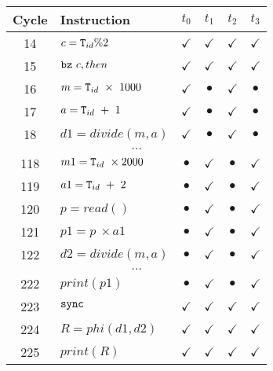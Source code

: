 \documentclass[times,10pt,twocolumn]{article}
\newcommand{\tid}{\mbox{\texttt{T}}_{id}}
\newcommand{\code}[1]{\mbox{\texttt{#1}}}
\begin{document}
\begin{figure}[b!]
\begin{center}
\begin{small}
\begin{tabular}{|c|l|c|c|c|c|} \hline
Cycle   & Instruction                  & $t_0$        & $t_1$        & $t_2$        & $t_3$        \\ \hline
14      & $ c = \tid \% 2$             & $\checkmark$ & $\checkmark$ & $\checkmark$ & $\checkmark$ \\ \hline
15      & $ \code{bz} \ c, then$ & $\checkmark$ & $\checkmark$ & $\checkmark$ & $\checkmark$ \\ \hline
16      & $ m = \tid \ \times \ 1000$        & $\checkmark$    & $\bullet$ & $\checkmark$ & $\bullet$ \\ \hline
17      & $ a = \tid \ + \ 1$ & $\checkmark$    & $\bullet$ & $\checkmark$ & $\bullet$ \\ \hline
18      & $ d1 = divide(m, a)$ & $\checkmark$    & $\bullet$ & $\checkmark$ & $\bullet$ \\ \hline
\multicolumn{6}{c}{$\ldots$} \\ \hline
118      & $ m1 = \tid \ \times 2000$ & $\bullet$    & $\checkmark$ & $\bullet$ & $\checkmark$ \\ \hline
119     & $ a1 = \tid \ + \ 2$        & $\bullet$    & $\checkmark$    & $\bullet$ & $\checkmark$ \\ \hline
120     & $ p = read()$ & $\bullet$    & $\checkmark$    & $\bullet$ & $\checkmark$ \\ \hline
121     & $ p1 = p \ \times a1$ & $\bullet$    & $\checkmark$ & $\bullet$ & $\checkmark$ \\ \hline
122     & $ d2 = divide(m, a)$        & $\bullet$    & $\checkmark$    & $\bullet$ & $\checkmark$ \\ \hline
\multicolumn{6}{c}{$\ldots$} \\ \hline
222      & $ print(p1)$ & $\bullet$    & $\checkmark$    & $\bullet$ & $\checkmark$ \\ \hline
223     & $ \code{sync}$        & $\checkmark$ & $\checkmark$ & $\checkmark$ & $\checkmark$ \\ \hline
224     & $ R = phi(d1, d2)$    & $\checkmark$ & $\checkmark$ & $\checkmark$ & $\checkmark$ \\ \hline
225     & $ print(R)$ & $\checkmark$    & $\checkmark$ & $\checkmark$ & $\checkmark$ \\ \hline
\end{tabular}


\end{small}
\end{center}
\end{figure}
\end{document}
